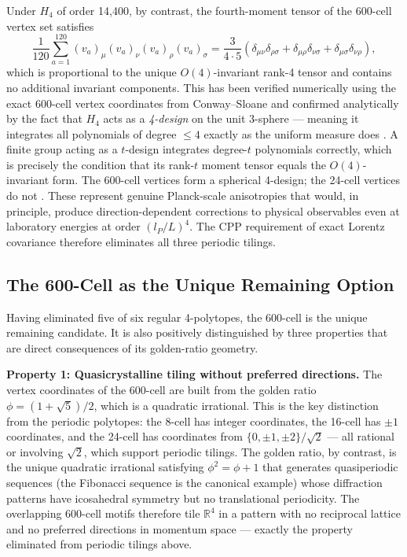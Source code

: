 \documentclass[11pt,letterpaper]{article}
\begin{document}
Under $H_4$ of order 14,400, by contrast, the fourth-moment tensor of the 600-cell vertex set satisfies
\begin{equation}
\frac{1}{120}\sum_{a=1}^{120} 
(v_a)_\mu(v_a)_\nu(v_a)_\rho(v_a)_\sigma 
= \frac{3}{4 \cdot 5}\left(\delta_{\mu\nu}\delta_{\rho\sigma} 
+ \delta_{\mu\rho}\delta_{\nu\sigma} 
+ \delta_{\mu\sigma}\delta_{\nu\rho}\right),
\label{eq:H4_rank4}
\end{equation}
which is proportional to the unique $O(4)$-invariant rank-4 tensor and contains no additional invariant components. This has been verified numerically using the exact 600-cell vertex coordinates from Conway--Sloane \cite{conway1988} and confirmed analytically by the fact that $H_4$ acts as a \emph{4-design} on the unit 3-sphere — meaning it integrates all polynomials of degree $\leq 4$ exactly as the uniform measure does \cite{coxeter1973}. A finite group acting as a $t$-design integrates degree-$t$ polynomials correctly, which is precisely the condition that its rank-$t$ moment tensor equals the $O(4)$-invariant form. The 600-cell vertices form a spherical 4-design; the 24-cell vertices do not \cite{bannai1979}. These represent genuine Planck-scale anisotropies that would, in principle, produce direction-dependent corrections to physical observables even at laboratory energies at order $(l_P/L)^4$. The CPP requirement of exact Lorentz covariance therefore eliminates all three periodic tilings.

\subsection{The 600-Cell as the Unique Remaining Option}

Having eliminated five of six regular 4-polytopes, the 600-cell is the unique remaining candidate. It is also positively distinguished by three properties that are direct consequences of its golden-ratio geometry.

\textbf{Property 1: Quasicrystalline tiling without preferred directions.} 
The vertex coordinates of the 600-cell are built from the golden ratio $\phi = (1+\sqrt{5})/2$, which is a quadratic irrational. This is the key distinction from the periodic polytopes: the 8-cell has integer coordinates, the 16-cell has $\pm 1$ coordinates, and the 24-cell has coordinates from $\{0, \pm 1, \pm 2\}/\sqrt{2}$ — all rational or involving $\sqrt{2}$, which support periodic tilings. The golden ratio, 
by contrast, is the unique quadratic irrational satisfying 
$\phi^2 = \phi + 1$ that generates quasiperiodic sequences (the Fibonacci sequence is the canonical example) whose diffraction patterns have icosahedral symmetry but no translational periodicity. The overlapping 600-cell motifs therefore tile $\mathbb{R}^4$ in a pattern with no reciprocal lattice and no preferred directions in momentum space 
— exactly the property eliminated from periodic tilings above.
\end{document}
